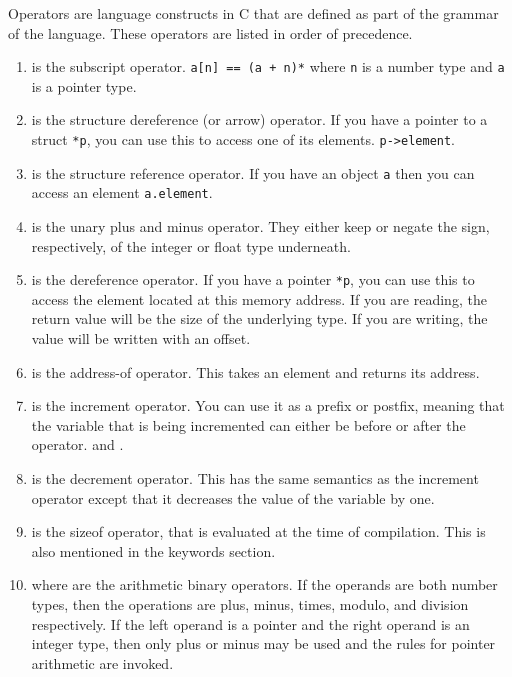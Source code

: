 Operators are language constructs in C that are defined as part of the grammar of the language.
These operators are listed in order of precedence.

\begin{enumerate}
<<<<<<< HEAD
\item \keyword{[]} is the subscript operator.
  \texttt{a[n] == (a + n)*} where \texttt{n} is a number type and \texttt{a} is a pointer type.
\item \keyword{->} is the structure dereference (or arrow) operator.
  If you have a pointer to a struct \texttt{*p}, you can use this to access one of its elements.
  \texttt{p->element}.
\item {} is the structure reference operator.
  If you have an object \texttt{a} then you can access an element \texttt{a.element}.
\item {} is the unary plus and minus operator.
  They either keep or negate the sign, respectively, of the integer or float type underneath.
\item {} is the dereference operator.
  If you have a pointer \texttt{*p}, you can use this to access the element located at this memory address.
  If you are reading, the return value will be the size of the underlying type.
  If you are writing, the value will be written with an offset.
\item {} is the address-of operator.
  This takes an element and returns its address.
\item \keyword{++} is the increment operator.
  You can use it as a prefix or postfix, meaning that the variable that is being incremented can either be before or after the operator.
   and .
\item \keyword{--} is the decrement operator.
  This has the same semantics as the increment operator except that it decreases the value of the variable by one.
\item {} is the sizeof operator, that is evaluated at the time of compilation.
  This is also mentioned in the keywords section.
\item {} where  are the arithmetic binary operators.
  If the operands are both number types, then the operations are plus, minus, times, modulo, and division respectively.
  If the left operand is a pointer and the right operand is an integer type, then only plus or minus may be used and the rules for pointer arithmetic are invoked.

\end{enumerate}
